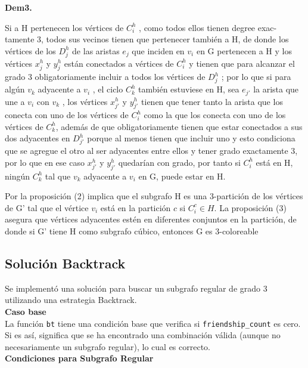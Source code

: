 \documentclass[
10pt, %
a4paper, %
oneside, %
headinclude,footinclude, %
BCOR5mm, %
]{scrartcl}
\begin{document}
\textbf{Dem3.}

Si a H pertenecen los vértices de $C^h_i$ , como todos ellos tienen degree exac-
tamente 3, todos sus vecinos tienen que pertenecer también a H, de donde los
vértices de los $D^h_j$ de las aristas $e_j$ que inciden en $v_i$ en G pertenecen a H y los
vértices $x^h_j$ y $y^h_j$ están conectados a vértices de $C^h_i$ y tienen que para alcanzar el
grado 3 obligatoriamente incluir a todos los vértices de $D^h_j$ ; por lo que si para
algún $v_k$ adyacente a $v_i$ , el ciclo $C^h_k$ también estuviese en H, sea $e_{j'}$ la arista
que une a $v_i$ con $v_k$ , los vértices $x_{j'}^{h}$ y $y_{j'}^{h}$ tienen que tener tanto la arista que los conecta
con uno de los vértices de $C^h_i$ como la que los conecta con uno de los vértices de $C^h_k$, además de que obligatoriamente tienen que estar 
conectados a sus dos adyacentes en $D_{j'}^{h}$ porque al menos tienen que incluir uno y esto condiciona que se agregue el otro al ser adyacentes 
entre ellos y tener grado exactamente 3, por lo que en ese caso $x_{j'}^{h}$ y $y_{j'}^{h}$ quedarían con grado, por tanto si $C^h_i$ está en H, ningún $C^h_k$ tal que $v_k$ adyacente a $v_i$ en G, puede estar en H.


Por la proposición (2) implica que el subgrafo H es una 3-partición de
los vértices de G' tal que el vértice $v_i$ está en la partición $c$ si $C^c_i \in H$. La
proposición (3) asegura que vértices adyacentes estén en diferentes conjuntos en
la partición, de donde si G' tiene H como subgrafo cúbico, entonces G es
3-coloreable



\subsection{Solución Backtrack}

Se implement\'o una solución para buscar un subgrafo regular de grado 3 utilizando una estrategia Backtrack.\\

\textbf{Caso base}\\

La función \texttt{bt} tiene una condición base que verifica si \texttt{friendship\_count} es cero. Si es así, significa que se ha encontrado una combinación válida (aunque no necesariamente un subgrafo regular), lo cual es correcto.\\


\textbf{Condiciones para Subgrafo Regular}\\
\end{document}
